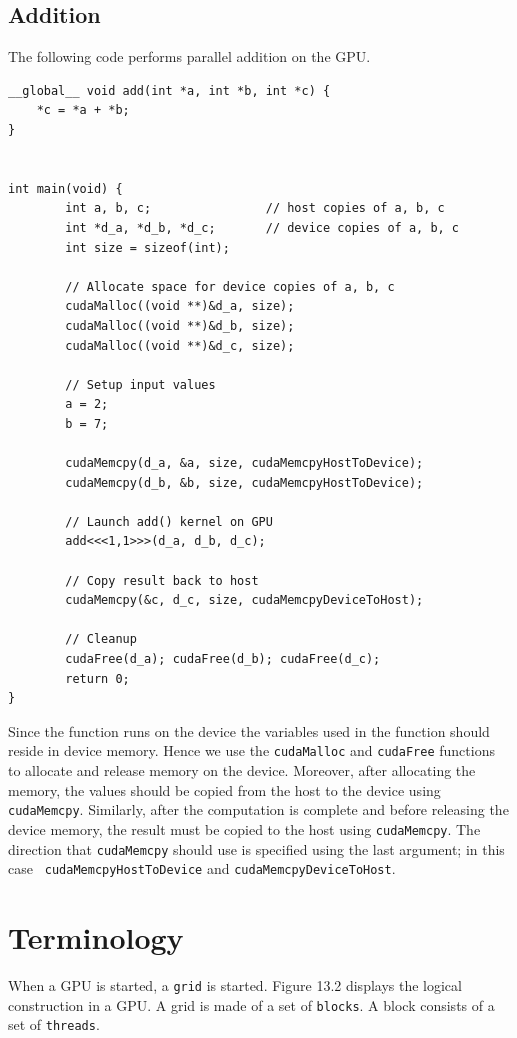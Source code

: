\documentclass[twoside]{article}
\begin{document}
\subsection{Addition}

The following code performs parallel addition on the GPU.

\begin{verbatim}
__global__ void add(int *a, int *b, int *c) {
    *c = *a + *b;
}


int main(void) {
	    int a, b, c;	            // host copies of a, b, c
	    int *d_a, *d_b, *d_c;	    // device copies of a, b, c
	    int size = sizeof(int);
	
	    // Allocate space for device copies of a, b, c
	    cudaMalloc((void **)&d_a, size);
	    cudaMalloc((void **)&d_b, size);
	    cudaMalloc((void **)&d_c, size);

	    // Setup input values
	    a = 2;
	    b = 7;

	    cudaMemcpy(d_a, &a, size, cudaMemcpyHostToDevice);
	    cudaMemcpy(d_b, &b, size, cudaMemcpyHostToDevice);

	    // Launch add() kernel on GPU
	    add<<<1,1>>>(d_a, d_b, d_c);

	    // Copy result back to host
	    cudaMemcpy(&c, d_c, size, cudaMemcpyDeviceToHost);

	    // Cleanup
	    cudaFree(d_a); cudaFree(d_b); cudaFree(d_c);
	    return 0;
}
\end{verbatim}

Since the {\add} function runs on the device the variables used in the
function should reside in device memory. Hence we use the {\tt cudaMalloc}
and {\tt cudaFree} functions to allocate and release memory on the device.
Moreover, after allocating the memory, the values should be copied from the
host to the device using {\tt cudaMemcpy}. Similarly, after the computation
is complete and before releasing the device memory, the result must be
copied to the host using {\tt cudaMemcpy}. The direction that {\tt cudaMemcpy}
should use is specified using the last argument; in this case {\tt
cudaMemcpyHostToDevice} and {\tt cudaMemcpyDeviceToHost}.

\section{Terminology}

When a GPU is started, a {\tt grid} is started. Figure 13.2 displays the
logical construction in a GPU. A grid is made of a set of {\tt blocks}. A
block consists of a set of {\tt threads}.
\end{document}
